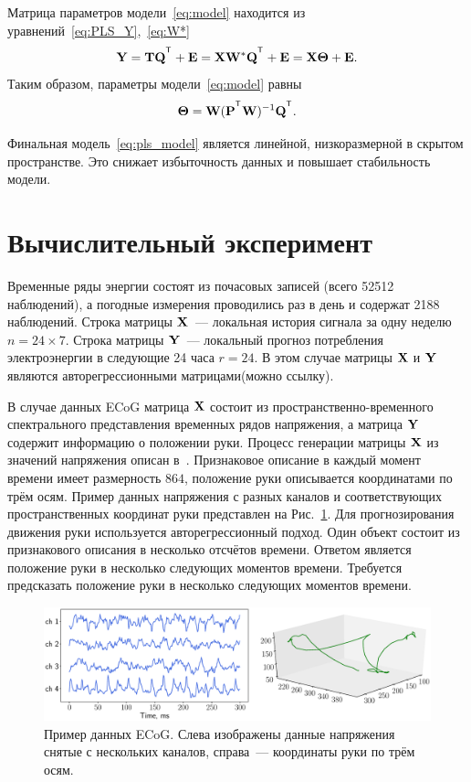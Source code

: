 Матрица параметров модели~\ref{eq:model} находится из уравнений~\eqref{eq:PLS_Y},~\eqref{eq:W*}
\begin{equation*}
\bY = \bT \bQ^{\T} + \bE = \bX \bW^* \bQ^{\T} + \bE = \bX \bTheta + \bE.
\label{eq:pls_model}
\end{equation*}
Таким образом, параметры модели~\eqref{eq:model} равны
\begin{equation}
\bTheta = \bW (\bP^{\T} \bW)^{-1} \bQ^{\T}.
\label{eq:model_parameters}
\end{equation}

Финальная модель~\eqref{eq:pls_model} является линейной, низкоразмерной в скрытом пространстве. 
Это снижает избыточность данных и повышает стабильность модели.


\section{Вычислительный эксперимент}
Временные ряды энергии состоят из почасовых записей (всего 52512 наблюдений), а погодные измерения проводились раз в день и содержат 2188 наблюдений. 
Строка матрицы $\mathbf{X}$~--– локальная история сигнала за одну неделю $n = 24 \times 7$. Строка матрицы $\mathbf{Y}$~--- локальный прогноз потребления электроэнергии в следующие 24 часа $r = 24$. В этом случае матрицы $\mathbf{X}$ и $\mathbf{Y}$ являются авторегрессионными матрицами(можно ссылку).

В случае данных ECoG матрица $\mathbf{X}$ состоит из пространственно-временного спектрального представления временных рядов напряжения, а матрица $\mathbf{Y}$ содержит информацию о положении руки. 
Процесс генерации матрицы $\mathbf{X}$ из значений напряжения описан в~\cite{motrenko2018multi}. 
Признаковое описание в каждый момент времени имеет размерность $864$, положение руки описывается координатами по трём осям. 
Пример данных напряжения с разных каналов и соответствующих пространственных координат руки представлен на Рис.~\ref{fig::ecog_data}.
Для прогнозирования движения руки используется авторегрессионный подход.
Один объект состоит из признакового описания в несколько отсчётов времени. 
Ответом является положение руки в несколько следующих моментов времени.
Требуется предсказать положение руки в несколько следующих моментов времени.

\begin{figure}
	\includegraphics[width=\linewidth]{figs/ch1/ecog_data}
	\caption{Пример данных ECoG. Слева изображены данные напряжения снятые с нескольких каналов, справа~--- координаты руки по трём осям.}
	\label{fig::ecog_data}
\end{figure}

